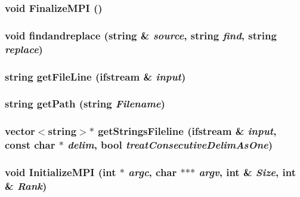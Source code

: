 \subsubsection{\setlength{\rightskip}{0pt plus 5cm}void FinalizeMPI ()}\label{Scheduler_8h_b01492e7612823a34a325619f46862e5}


\subsubsection{\setlength{\rightskip}{0pt plus 5cm}void findandreplace (string \& {\em source}, string {\em find}, string {\em replace})}\label{Scheduler_8h_f35bdd351ea96f77bd306c2dad2e8a16}


\subsubsection{\setlength{\rightskip}{0pt plus 5cm}string getFileLine (ifstream \& {\em input})}\label{Scheduler_8h_6ef576c7fbc8f10f7937e5cd8d747e96}


\subsubsection{\setlength{\rightskip}{0pt plus 5cm}string getPath (string {\em Filename})}\label{Scheduler_8h_fc7f382e4ff9f72a1afa74bf2d32d865}


\subsubsection{\setlength{\rightskip}{0pt plus 5cm}vector$<$string$>$$\ast$ getStringsFileline (ifstream \& {\em input}, const char $\ast$ {\em delim}, bool {\em treatConsecutiveDelimAsOne})}\label{Scheduler_8h_1d40d62ed9b660097daf92c4e941414f}


\subsubsection{\setlength{\rightskip}{0pt plus 5cm}void InitializeMPI (int $\ast$ {\em argc}, char $\ast$$\ast$$\ast$ {\em argv}, int \& {\em Size}, int \& {\em Rank})}\label{Scheduler_8h_0218beda002d263b8b792964cb874a82}


